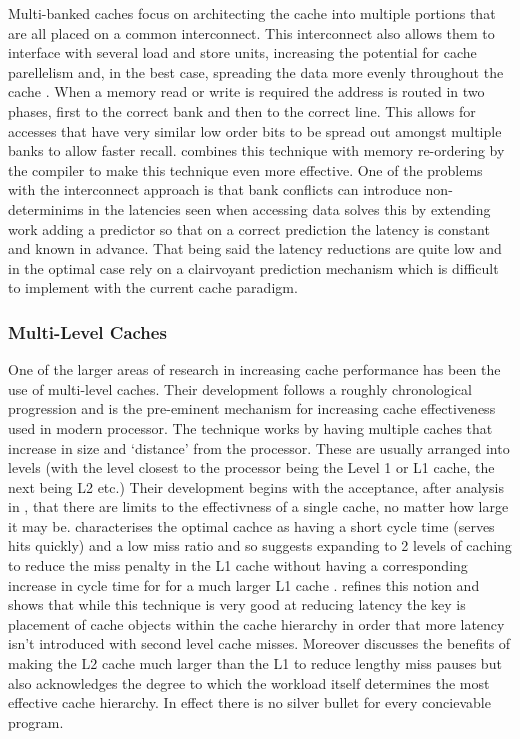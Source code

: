 Multi-banked caches focus on architecting the cache into multiple portions that are all placed on a common interconnect. This interconnect also allows them to interface with several load and store units, increasing the potential for cache parellelism and, in the best case, spreading the data more evenly throughout the cache \cite{riversHighbandwidthDataCache1997}. When a memory read or write is required the address is routed in two phases, first to the correct bank and then to the correct line. This allows for accesses that have very similar low order bits to be spread out amongst multiple banks to allow faster recall. \citet{riversHighbandwidthDataCache1997} combines this technique with memory re-ordering by the compiler to make this technique even more effective. One of the problems with the interconnect approach is that bank conflicts can introduce non-determinims in the latencies seen when accessing data \citet{neefsTechniqueHighBandwidth2000} solves this by extending \citeauthor{riversHighbandwidthDataCache1997} work adding a predictor so that on a correct prediction the latency is constant and known in advance. That being said the latency reductions are quite low and in the optimal case rely on a clairvoyant prediction mechanism which is difficult to implement with the current cache paradigm.

\subsubsection{Multi-Level Caches}

One of the larger areas of research in increasing cache performance has been the use of multi-level caches. Their development follows a roughly chronological progression and is the pre-eminent mechanism for increasing cache effectiveness used in modern processor. The technique works by having multiple caches that increase in size and `distance' from the processor. These are usually arranged into levels (with the level closest to the processor being the Level 1 or L1 cache, the next being L2 etc.) Their development begins with the acceptance, after analysis in \citet{przybylskiPerformanceTradeoffsCache1988}, that there are limits to the effectivness of a single cache, no matter how large it may be. \citet{przybylskiCharacteristicsPerformanceOptimalMultilevel1989} characterises the optimal cachce as having a short cycle time (serves hits quickly) and a low miss ratio and so suggests expanding to 2 levels of caching to reduce the miss penalty in the L1 cache without having a corresponding increase in cycle time for for a much larger L1 cache \cite{jouppiTradeoffsTwolevelOnchip1994}. \citet{azimiTwoLevelCache1992} refines this notion and shows that while this technique is very good at reducing latency the key is placement of cache objects within the cache hierarchy in order that more latency isn't introduced with second level cache misses. Moreover \citet{ju-hotangPerformanceDesignChoices1994} discusses the benefits of making the L2 cache much larger than the L1 to reduce lengthy miss pauses but also acknowledges the degree to which the workload itself determines the most effective cache hierarchy. In effect there is no silver bullet for every concievable program. 

